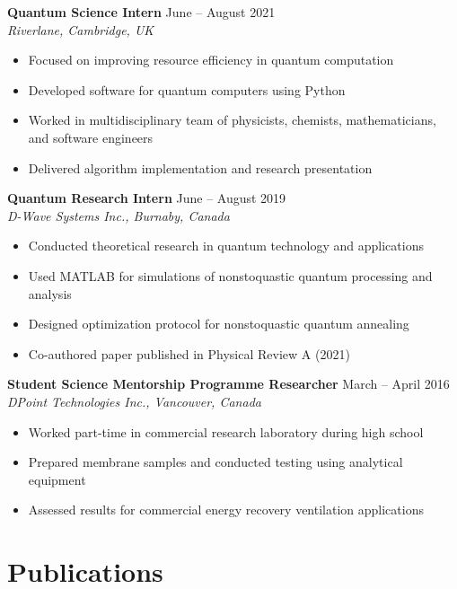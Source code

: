\documentclass[11pt,a4paper]{article}
\newcommand{\cventry}[4]{%
    \noindent\textbf{#1} \hfill #2\\
    \textit{#3} \hfill #4\\[0.1em]
}
\begin{document}
\cventry{Quantum Science Intern}{June -- August 2021}{Riverlane, Cambridge, UK}{}
\begin{itemize}
    \item Focused on improving resource efficiency in quantum computation
    \item Developed software for quantum computers using Python
    \item Worked in multidisciplinary team of physicists, chemists, mathematicians, and software engineers
    \item Delivered algorithm implementation and research presentation
\end{itemize}

\cventry{Quantum Research Intern}{June -- August 2019}{D-Wave Systems Inc., Burnaby, Canada}{}
\begin{itemize}
    \item Conducted theoretical research in quantum technology and applications
    \item Used MATLAB for simulations of nonstoquastic quantum processing and analysis
    \item Designed optimization protocol for nonstoquastic quantum annealing
    \item Co-authored paper published in Physical Review A (2021)
\end{itemize}

\cventry{Student Science Mentorship Programme Researcher}{March -- April 2016}{DPoint Technologies Inc., Vancouver, Canada}{}
\begin{itemize}
    \item Worked part-time in commercial research laboratory during high school
    \item Prepared membrane samples and conducted testing using analytical equipment
    \item Assessed results for commercial energy recovery ventilation applications
\end{itemize}

\section*{Publications}
\end{document}
